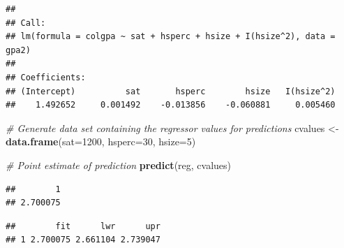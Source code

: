 \documentclass[]{book}
\newenvironment{Shaded}{\begin{snugshade}}{\end{snugshade}}
\newcommand{\CommentTok}[1]{\textcolor[rgb]{0.56,0.35,0.01}{\textit{#1}}}
\newcommand{\DataTypeTok}[1]{\textcolor[rgb]{0.13,0.29,0.53}{#1}}
\newcommand{\DecValTok}[1]{\textcolor[rgb]{0.00,0.00,0.81}{#1}}
\newcommand{\FloatTok}[1]{\textcolor[rgb]{0.00,0.00,0.81}{#1}}
\newcommand{\KeywordTok}[1]{\textcolor[rgb]{0.13,0.29,0.53}{\textbf{#1}}}
\newcommand{\NormalTok}[1]{#1}
\newcommand{\StringTok}[1]{\textcolor[rgb]{0.31,0.60,0.02}{#1}}
\begin{document}
\begin{verbatim}
## 
## Call:
## lm(formula = colgpa ~ sat + hsperc + hsize + I(hsize^2), data = gpa2)
## 
## Coefficients:
## (Intercept)          sat       hsperc        hsize   I(hsize^2)  
##    1.492652     0.001492    -0.013856    -0.060881     0.005460
\end{verbatim}

\begin{Shaded}
\begin{Highlighting}[]
\CommentTok{# Generate data set containing the regressor values for predictions}
\NormalTok{cvalues <-}\StringTok{ }\KeywordTok{data.frame}\NormalTok{(}\DataTypeTok{sat=}\DecValTok{1200}\NormalTok{, }\DataTypeTok{hsperc=}\DecValTok{30}\NormalTok{, }\DataTypeTok{hsize=}\DecValTok{5}\NormalTok{)}

\CommentTok{# Point estimate of prediction}
\KeywordTok{predict}\NormalTok{(reg, cvalues)}
\end{Highlighting}
\end{Shaded}

\begin{verbatim}
##        1 
## 2.700075
\end{verbatim}

\begin{Shaded}
\end{Shaded}

\begin{verbatim}
##        fit      lwr      upr
## 1 2.700075 2.661104 2.739047
\end{verbatim}

\begin{Shaded}
\end{Shaded}
\end{document}

